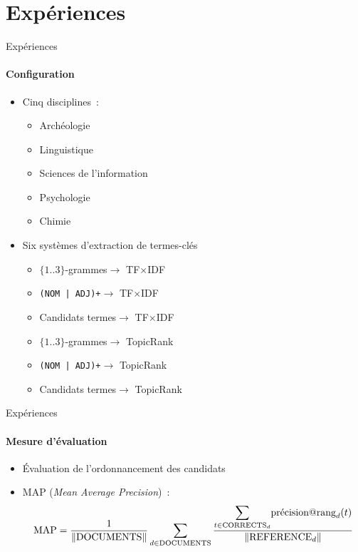 \section{Expériences}
  \begin{frame}[allowframebreaks]{Expériences}
    \framesubtitle{Configuration}

    \begin{itemize}
      \item{Cinq disciplines~:}
      \begin{itemize}
        \item{Archéologie}
        \item{Linguistique}
        \item{Sciences de l'information}
        \item{Psychologie}
        \item{Chimie}
      \end{itemize}
      \item{Six systèmes d'extraction de termes-clés}
      \begin{itemize}
        \item{$\{1..3\}$-grammes\hfill$\longrightarrow$ TF$\times$IDF\hspace{14.75em}~}
        \item{\texttt{(NOM | ADJ)+}\hfill$\longrightarrow$ TF$\times$IDF\hspace{14.75em}~}
        \item{Candidats termes\hfill$\longrightarrow$ TF$\times$IDF\hspace{14.75em}~}
        \item{$\{1..3\}$-grammes\hfill$\longrightarrow$ TopicRank\hspace{13.915em}~}
        \item{\texttt{(NOM | ADJ)+}\hfill$\longrightarrow$ TopicRank\hspace{13.915em}~}
        \item{Candidats termes\hfill$\longrightarrow$ TopicRank\hspace{13.915em}~}
      \end{itemize}
    \end{itemize}
  \end{frame}

  \begin{frame}[allowframebreaks]{Expériences}
    \framesubtitle{Mesure d'évaluation}

    \begin{itemize}
      \item{Évaluation de l'ordonnancement des candidats}
      \item{MAP (\textit{Mean Average Precision})~:}
      \footnotesize
      \begin{align*}
        \text{MAP} = \frac{1}{\|\text{DOCUMENTS}\|} \sum_{d \in \text{DOCUMENTS}} \frac{\mathlarger\sum_{t \in \text{CORRECTS}_d} \text{précision}@\text{rang}_d(t)}{\|\text{REFERENCE}_d\|}
      \end{align*}
    \end{itemize}
  \end{frame}

